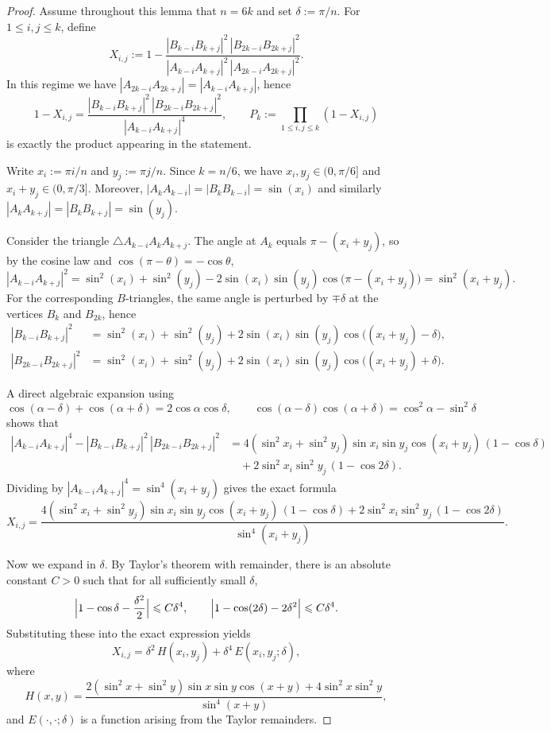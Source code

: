 \documentclass{article}
\theoremstyle{definition}
\let\le\leqslant
\begin{document}
\begin{proof}
Assume throughout this lemma that $n=6k$ and set $\delta:=\pi/n$.
For $1\le i,j\le k$, define
\[
X_{i,j}:=1-\frac{|B_{k-i}B_{k+j}|^2\,|B_{2k-i}B_{2k+j}|^2}{|A_{k-i}A_{k+j}|^2\,|A_{2k-i}A_{2k+j}|^2}.
\]
In this regime we have $|A_{2k-i}A_{2k+j}|=|A_{k-i}A_{k+j}|$, hence
\[
1-X_{i,j}
=\frac{|B_{k-i}B_{k+j}|^2\,|B_{2k-i}B_{2k+j}|^2}{|A_{k-i}A_{k+j}|^4},
\qquad
P_k:=\prod_{1\le i,j\le k}(1-X_{i,j})
\]
is exactly the product appearing in the statement.

Write $x_i:=\pi i/n$ and $y_j:=\pi j/n$. Since $k=n/6$, we have
$x_i,y_j\in(0,\pi/6]$ and $x_i+y_j\in(0,\pi/3]$.
Moreover, $|A_kA_{k-i}|=|B_kB_{k-i}|=\sin(x_i)$ and similarly $|A_kA_{k+j}|=|B_kB_{k+j}|=\sin(y_j)$.

Consider the triangle $\triangle A_{k-i}A_kA_{k+j}$. The angle at $A_k$ equals
$\pi-(x_i+y_j)$, so by the cosine law and $\cos(\pi-\theta)=-\cos\theta$,
\[
|A_{k-i}A_{k+j}|^2
=\sin^2(x_i)+\sin^2(y_j)-2\sin(x_i)\sin(y_j)\cos\bigl(\pi-(x_i+y_j)\bigr)
=\sin^2(x_i+y_j).
\]
For the corresponding $B$-triangles, the same angle is perturbed by $\mp\delta$ at the vertices
$B_k$ and $B_{2k}$, hence
\begin{align*}
|B_{k-i}B_{k+j}|^2
&=\sin^2(x_i)+\sin^2(y_j)+2\sin(x_i)\sin(y_j)\cos\bigl((x_i+y_j)-\delta\bigr),\\
|B_{2k-i}B_{2k+j}|^2
&=\sin^2(x_i)+\sin^2(y_j)+2\sin(x_i)\sin(y_j)\cos\bigl((x_i+y_j)+\delta\bigr).
\end{align*}

A direct algebraic expansion using
\[
\cos(\alpha-\delta)+\cos(\alpha+\delta)=2\cos\alpha\cos\delta,
\qquad
\cos(\alpha-\delta)\cos(\alpha+\delta)=\cos^2\alpha-\sin^2\delta
\]
shows that
\begin{align*}
|A_{k-i}A_{k+j}|^4-|B_{k-i}B_{k+j}|^2\,|B_{2k-i}B_{2k+j}|^2
&=
4(\sin^2 x_i+\sin^2 y_j)\sin x_i\sin y_j\cos(x_i+y_j)\,(1-\cos\delta)\\
&\quad
+2\sin^2 x_i\sin^2 y_j\,(1-\cos 2\delta).
\end{align*}
Dividing by $|A_{k-i}A_{k+j}|^4=\sin^4(x_i+y_j)$ gives the exact formula
\[
X_{i,j}
=
\frac{4(\sin^2 x_i+\sin^2 y_j)\sin x_i\sin y_j\cos(x_i+y_j)\,(1-\cos\delta)
+2\sin^2 x_i\sin^2 y_j\,(1-\cos 2\delta)}{\sin^4(x_i+y_j)}.
\]

Now we expand in $\delta$. By Taylor's theorem with remainder, there is an absolute constant $C>0$
such that for all sufficiently small $\delta$,
\[
\Bigl|1-\cos\delta-\frac{\delta^2}{2}\Bigr|\le C\delta^4,
\qquad
\Bigl|1-\cos(2\delta)-2\delta^2\Bigr|\le C\delta^4.
\]
Substituting these into the exact expression yields
\[
X_{i,j}=\delta^2\,H(x_i,y_j)+\delta^4\,E(x_i,y_j;\delta),
\]
where
\[
H(x,y)
=
\frac{2(\sin^2 x+\sin^2 y)\sin x\sin y\cos(x+y)+4\sin^2 x\sin^2 y}{\sin^4(x+y)},
\]
and $E(\cdot,\cdot;\delta)$ is a function arising from the Taylor remainders.


\end{proof}
\end{document}

